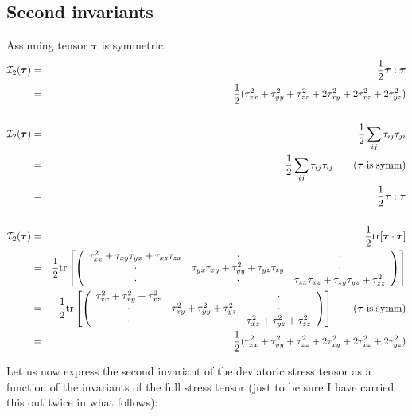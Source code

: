 
\subsection*{Second invariants}


Assuming tensor ${\bm \tau}$ is symmetric:
\begin{eqnarray}
{\cal I}_2(\bm\tau) 
&=& \frac12 {\bm \tau}:{\bm \tau} \nonumber\\
&=& \frac12 ( \tau_{xx}^2 + \tau_{yy}^2 +\tau_{zz}^2 + 2\tau_{xy}^2+ 2\tau_{xz}^2+ 2\tau_{yz}^2) 
\nonumber\\
\nonumber\\
{\cal I}_2(\bm\tau) 
&=& \frac12 \sum_{ij} \tau_{ij}\tau_{ji}  \nonumber\\
&=& \frac12 \sum_{ij} \tau_{ij}\tau_{ij}  \qquad (\rm{\bm\tau \; is\; symm}) \nonumber\\
&=& \frac12 {\bm \tau}:{\bm \tau} 
\nonumber\\
\nonumber\\
{\cal I}_2(\bm\tau) 
&=& \frac12 {\rm tr} [{\bm \tau}\cdot {\bm \tau}] \nonumber\\
&=& \frac{1}{2}{\rm tr} 
\left[
\left(
\begin{array}{ccc}
\tau_{xx}^2 + \tau_{xy}\tau_{yx} + \tau_{xz}\tau_{zx} & \cdot & \cdot \\
\cdot & \tau_{yx}\tau_{xy} + \tau_{yy}^2  + \tau_{yz}\tau_{zy} & \cdot  \\
\cdot & \cdot & \tau_{zx}\tau_{xz} + \tau_{zy}\tau_{yz} + \tau_{zz}^2 
\end{array}
\right)
\right] \nonumber\\
&=& \frac{1}{2}{\rm tr} 
\left[
\left(
\begin{array}{ccc}
\tau_{xx}^2 + \tau_{xy}^2 + \tau_{xz}^2 & \cdot & \cdot \\
\cdot & \tau_{xy}^2 + \tau_{yy}^2  + \tau_{yz}^2 & \cdot  \\
\cdot & \cdot & \tau_{xz}^2 + \tau_{yz}^2 + \tau_{zz}^2 
\end{array}
\right)
\right] \qquad ( \rm {\bm\tau\;  is\; symm}) \nonumber\\
&=& \frac12 ( \tau_{xx}^2 + \tau_{yy}^2 +\tau_{zz}^2 + 2\tau_{xy}^2+ 2\tau_{xz}^2+ 2\tau_{yz}^2)
\end{eqnarray}

\newpage
Let us now express the second invariant of the deviatoric stress tensor 
as a function of the invariants of the full stress tensor (just to be sure
I have carried this out twice in what follows): 

